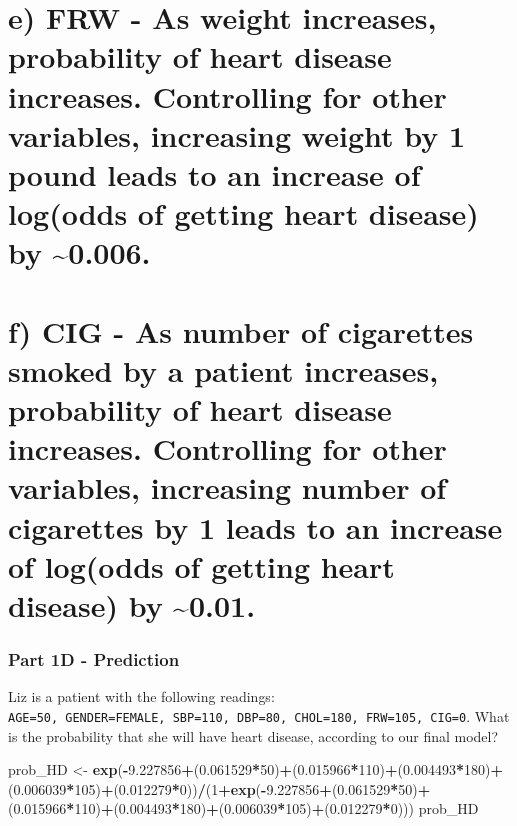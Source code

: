 \documentclass[]{article}
\newenvironment{Shaded}{\begin{snugshade}}{\end{snugshade}}
\newcommand{\KeywordTok}[1]{\textcolor[rgb]{0.13,0.29,0.53}{\textbf{#1}}}
\newcommand{\DecValTok}[1]{\textcolor[rgb]{0.00,0.00,0.81}{#1}}
\newcommand{\FloatTok}[1]{\textcolor[rgb]{0.00,0.00,0.81}{#1}}
\newcommand{\StringTok}[1]{\textcolor[rgb]{0.31,0.60,0.02}{#1}}
\newcommand{\OperatorTok}[1]{\textcolor[rgb]{0.81,0.36,0.00}{\textbf{#1}}}
\newcommand{\NormalTok}[1]{#1}
\begin{document}
\section{e) FRW - As weight increases, probability of heart disease
increases. Controlling for other variables, increasing weight by 1 pound
leads to an increase of log(odds of getting heart disease) by
\textasciitilde{}0.006.}\label{e-frw---as-weight-increases-probability-of-heart-disease-increases.-controlling-for-other-variables-increasing-weight-by-1-pound-leads-to-an-increase-of-logodds-of-getting-heart-disease-by-0.006.}

\section{f) CIG - As number of cigarettes smoked by a patient increases,
probability of heart disease increases. Controlling for other variables,
increasing number of cigarettes by 1 leads to an increase of log(odds of
getting heart disease) by
\textasciitilde{}0.01.}\label{f-cig---as-number-of-cigarettes-smoked-by-a-patient-increases-probability-of-heart-disease-increases.-controlling-for-other-variables-increasing-number-of-cigarettes-by-1-leads-to-an-increase-of-logodds-of-getting-heart-disease-by-0.01.}

\subsubsection{Part 1D - Prediction}\label{part-1d---prediction}

Liz is a patient with the following readings:
\texttt{AGE=50,\ GENDER=FEMALE,\ SBP=110,\ DBP=80,\ CHOL=180,\ FRW=105,\ CIG=0}.
What is the probability that she will have heart disease, according to
our final model?

\begin{Shaded}
\begin{Highlighting}[]
\NormalTok{prob_HD <-}\StringTok{ }\KeywordTok{exp}\NormalTok{(}\OperatorTok{-}\FloatTok{9.227856}\OperatorTok{+}\NormalTok{(}\FloatTok{0.061529}\OperatorTok{*}\DecValTok{50}\NormalTok{)}\OperatorTok{+}\NormalTok{(}\FloatTok{0.015966}\OperatorTok{*}\DecValTok{110}\NormalTok{)}\OperatorTok{+}\NormalTok{(}\FloatTok{0.004493}\OperatorTok{*}\DecValTok{180}\NormalTok{)}\OperatorTok{+}\NormalTok{(}\FloatTok{0.006039}\OperatorTok{*}\DecValTok{105}\NormalTok{)}\OperatorTok{+}\NormalTok{(}\FloatTok{0.012279}\OperatorTok{*}\DecValTok{0}\NormalTok{))}\OperatorTok{/}\NormalTok{(}\DecValTok{1}\OperatorTok{+}\KeywordTok{exp}\NormalTok{(}\OperatorTok{-}\FloatTok{9.227856}\OperatorTok{+}\NormalTok{(}\FloatTok{0.061529}\OperatorTok{*}\DecValTok{50}\NormalTok{)}\OperatorTok{+}\NormalTok{(}\FloatTok{0.015966}\OperatorTok{*}\DecValTok{110}\NormalTok{)}\OperatorTok{+}\NormalTok{(}\FloatTok{0.004493}\OperatorTok{*}\DecValTok{180}\NormalTok{)}\OperatorTok{+}\NormalTok{(}\FloatTok{0.006039}\OperatorTok{*}\DecValTok{105}\NormalTok{)}\OperatorTok{+}\NormalTok{(}\FloatTok{0.012279}\OperatorTok{*}\DecValTok{0}\NormalTok{)))}
\NormalTok{prob_HD}
\end{Highlighting}
\end{Shaded}
\end{document}
